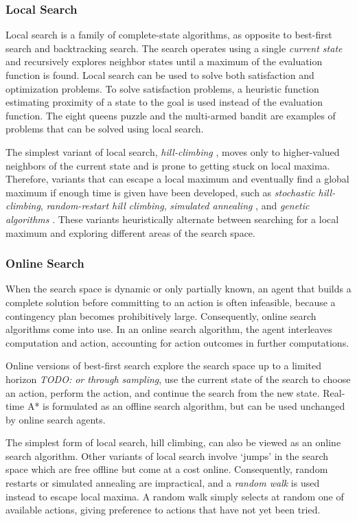\subsubsection{Local Search}

Local search is a family of complete-state algorithms, as opposite to
best-first search and backtracking search. The search operates using a
single {\em current state} and recursively explores neighbor states
until a maximum of the evaluation function is found. Local search can
be used to solve both satisfaction and optimization problems. To solve
satisfaction problems, a heuristic function estimating proximity of a
state to the goal is used instead of the evaluation function. The
eight queens puzzle and the multi-armed bandit are examples of
problems that can be solved using local search.

The simplest variant of local search, {\em hill-climbing}
\cite{Russell.aima}, moves only to higher-valued neighbors of the
current state and is prone to getting stuck on local maxima. Therefore,
variants that can escape a local maximum and eventually find a global
maximum if enough time is given have been developed, such as {\em
stochastic hill-climbing}, {\em random-restart hill climbing}, {\em
simulated annealing} \cite{Russell.aima}, and {\em genetic algorithms}
\cite{Eiben.evolcomp}. These variants heuristically alternate between
searching for a local maximum and exploring different areas of the
search space.

\subsubsection{Online Search}

When the search space is dynamic or only partially known, an agent
that builds a complete solution before committing to an action is
often infeasible, because a contingency plan becomes prohibitively
large. Consequently, online search algorithms come into use. In an
online search algorithm, the agent interleaves computation and action,
accounting for action outcomes in further computations.

Online versions of best-first search explore the search space up to a
limited horizon \emph{TODO: or through sampling}, use the current state
of the search to choose an action, perform the action, and continue
the search from the new state. Real-time A* is formulated as an offline
search algorithm, but can be used unchanged by online search agents.

The simplest form of local search, hill climbing, can also be
viewed as an online search algorithm. Other variants of local search
involve `jumps' in the search space which are free offline but come at
a cost online. Consequently, random restarts or simulated annealing
are impractical, and a {\em random walk} is used instead to escape
local maxima. A random walk simply selects at random one of available
actions, giving preference to actions that have not yet been tried.

